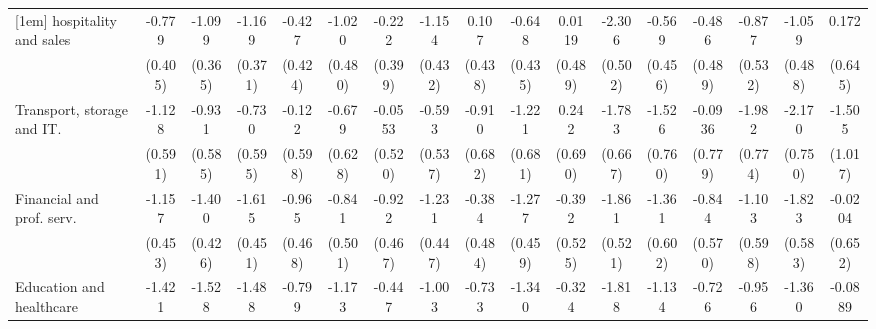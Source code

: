 {\begin{tabular}{l*{16}{c}}
[1em]
hospitality and sales&      -0.779         &      -1.099\sym{**} &      -1.169\sym{**} &      -0.427         &      -1.020\sym{*}  &      -0.222         &      -1.154\sym{**} &       0.107         &      -0.648         &      0.0119         &      -2.306\sym{***}&      -0.569         &      -0.486         &      -0.877         &      -1.059\sym{*}  &       0.172         \\
                    &     (0.405)         &     (0.365)         &     (0.371)         &     (0.424)         &     (0.480)         &     (0.399)         &     (0.432)         &     (0.438)         &     (0.435)         &     (0.489)         &     (0.502)         &     (0.456)         &     (0.489)         &     (0.532)         &     (0.488)         &     (0.645)         \\
[1em]
Transport, storage and IT.&      -1.128         &      -0.931         &      -0.730         &      -0.122         &      -0.679         &     -0.0553         &      -0.593         &      -0.910         &      -1.221         &       0.242         &      -1.783\sym{**} &      -1.526\sym{*}  &     -0.0936         &      -1.982\sym{*}  &      -2.170\sym{**} &      -1.505         \\
                    &     (0.591)         &     (0.585)         &     (0.595)         &     (0.598)         &     (0.628)         &     (0.520)         &     (0.537)         &     (0.682)         &     (0.681)         &     (0.690)         &     (0.667)         &     (0.760)         &     (0.779)         &     (0.774)         &     (0.750)         &     (1.017)         \\
[1em]
Financial and prof. serv.&      -1.157\sym{*}  &      -1.400\sym{**} &      -1.615\sym{***}&      -0.965\sym{*}  &      -0.841         &      -0.922\sym{*}  &      -1.231\sym{**} &      -0.384         &      -1.277\sym{**} &      -0.392         &      -1.861\sym{***}&      -1.361\sym{*}  &      -0.844         &      -1.103         &      -1.823\sym{**} &     -0.0204         \\
                    &     (0.453)         &     (0.426)         &     (0.451)         &     (0.468)         &     (0.501)         &     (0.467)         &     (0.447)         &     (0.484)         &     (0.459)         &     (0.525)         &     (0.521)         &     (0.602)         &     (0.570)         &     (0.598)         &     (0.583)         &     (0.652)         \\
[1em]
Education and healthcare&      -1.421\sym{**} &      -1.528\sym{***}&      -1.488\sym{***}&      -0.799         &      -1.173\sym{*}  &      -0.447         &      -1.003\sym{*}  &      -0.733         &      -1.340\sym{**} &      -0.324         &      -1.818\sym{***}&      -1.134\sym{*}  &      -0.726         &      -0.956         &      -1.360\sym{*}  &     -0.0889         \\

\end{tabular}}
